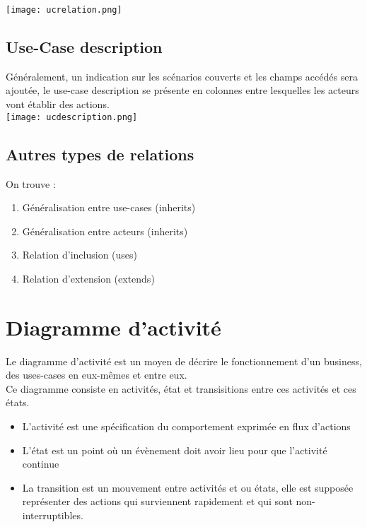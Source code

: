 \documentclass{report}
\begin{document}
			\texttt{[image: ucrelation.png]}\\

		\subsection{Use-Case description}

			Généralement, un indication sur les scénarios couverts et les champs accédés sera ajoutée, le use-case description se présente en colonnes entre lesquelles les acteurs vont établir des actions.\\

			\texttt{[image: ucdescription.png]}

		\subsection{Autres types de relations}

			On trouve : \\

			\begin{enumerate}
				\item Généralisation entre use-cases (inherits)
				\item Généralisation entre acteurs (inherits)
				\item Relation d'inclusion (uses)
				\item Relation d'extension (extends)
			\end{enumerate}

	\section{Diagramme d'activité}

		Le diagramme d'activité est un moyen de décrire le fonctionnement d'un business, des uses-cases en eux-mêmes et entre eux.\\

		Ce diagramme consiste en activités, état et transisitions entre ces activités et ces états.\\

		\begin{itemize}
			\item L'activité est une spécification du comportement exprimée en flux d'actions
			\item L'état est un point où un évènement doit avoir lieu pour que l'activité continue
			\item La transition est un mouvement entre activités et ou états, elle est supposée représenter des actions qui surviennent rapidement et qui sont non-interruptibles.\\
		\end{itemize}
\end{document}
